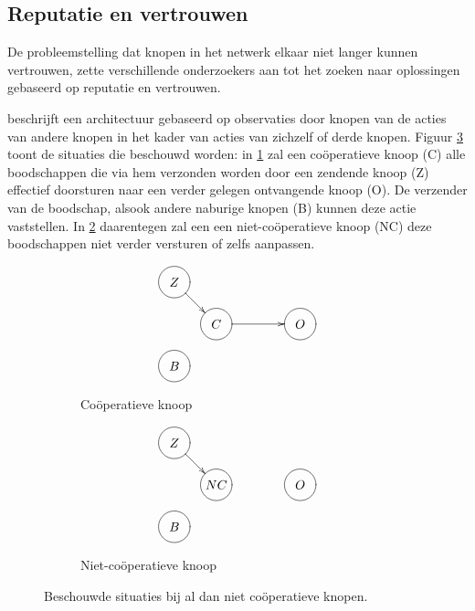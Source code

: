 
\subsection{Reputatie en vertrouwen}
\label{subsection:reputation}

De probleemstelling dat knopen in het netwerk elkaar niet langer kunnen
vertrouwen, zette verschillende onderzoekers aan tot het zoeken naar
oplossingen gebaseerd op reputatie en vertrouwen.

\citep{ganeriwal2008reputation} beschrijft een architectuur gebaseerd op
observaties door knopen van de acties van andere knopen in het kader van acties
van zichzelf of derde knopen. Figuur \ref{fig:reputation-cooperation} toont de
situaties die beschouwd worden: in \ref{fig:reputation-cooperative-node} zal
een co\"operatieve knoop (C) alle boodschappen die via hem verzonden worden
door een zendende knoop (Z) effectief doorsturen naar een verder gelegen
ontvangende knoop (O). De verzender van de boodschap, alsook andere naburige
knopen (B) kunnen deze actie vaststellen. In
\ref{fig:reputation-uncooperative-node} daarentegen zal een een
niet-co\"operatieve knoop (NC) deze boodschappen niet verder versturen of zelfs
aanpassen.

\begin{figure}
\centering
\begin{subfigure}{.49\textwidth}
\centering
\[ \entrymodifiers={-=+++[o][F-]}
 \xymatrix@!=0.75pc {
  Z \ar[dr] & *{}       & *{} & *{} \\
  *{}       & C \ar[rr] & *{} & O   \\
  B         & *{}       & *{} & *{} \\
 }
\]
\caption{Co\"operatieve knoop}
\label{fig:reputation-cooperative-node}
\end{subfigure}
\begin{subfigure}{.49\textwidth}
\centering
\[ \entrymodifiers={-=+++[o][F-]}
 \xymatrix@!=0.75pc {
  Z \ar[dr] & *{}       & *{} & *{} \\
  *{}       & NC        & *{} & O   \\
  B         & *{}       & *{} & *{} \\
 }
\]
\caption{Niet-co\"operatieve knoop}
\label{fig:reputation-uncooperative-node}
\end{subfigure}
\caption{Beschouwde situaties bij al dan niet co\"operatieve knopen.}
\label{fig:reputation-cooperation}
\end{figure}

